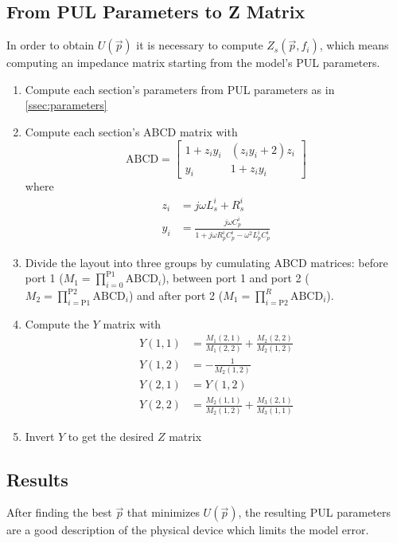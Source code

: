 \subsection{From PUL Parameters to Z Matrix}
\label{ssec:from-parameters-to-Z-matrix}
In order to obtain $U(\vec{p})$ it is necessary to compute $Z_s\left(\vec{p}, f_i\right)$, which means computing an impedance matrix starting from the model's PUL parameters.
\begin{enumerate}
    \item Compute each section's parameters from PUL parameters as in \autoref{ssec:parameters}
    \item Compute each section's ABCD matrix with
    \begin{equation*}
        \text{ABCD} = \begin{bmatrix}
            1 + z_i y_i   & (z_i y_i + 2) z_i \\
            y_i           & 1 + z_i y_i
        \end{bmatrix}
    \end{equation*}
    where
    \begin{align*}
        z_i &= j \omega L_s^i + R_s^i \\
        y_i &= \frac{j \omega C_p^i}{1 + j\omega R_p^i C_p^i - \omega^2 L_p^i C_p^i}
    \end{align*}
    \item Divide the layout into three groups by cumulating ABCD matrices: before port 1 ($M_1 = \prod_{i = 0} ^ \text{P1} \text{ABCD}_i$), between port 1 and port 2 ($M_2 = \prod_{i = \text{P1}} ^ \text{P2} \text{ABCD}_i$) and after port 2 ($M_1 = \prod_{i = \text{P2}} ^ R \text{ABCD}_i$).

    \item Compute the $Y$ matrix with
    \begin{align*}
        Y(1, 1) &= \frac{M_1(2, 1)}{M_1(2, 2)} + \frac{M_2(2, 2)}{M_2(1, 2)} \\
        Y(1, 2) &= -\frac{1}{M_2(1, 2)} \\
        Y(2, 1) &= Y(1, 2) \\
        Y(2, 2) &= \frac{M_2(1, 1)}{M_2(1, 2)} + \frac{M_3(2, 1)}{M_3(1, 1)}
    \end{align*}
    \item Invert $Y$ to get the desired $Z$ matrix
\end{enumerate}

\subsection{Results}
After finding the best $\vec{p}$ that minimizes $U(\vec{p})$, the resulting PUL parameters are a good description of the physical device which limits the model error.
